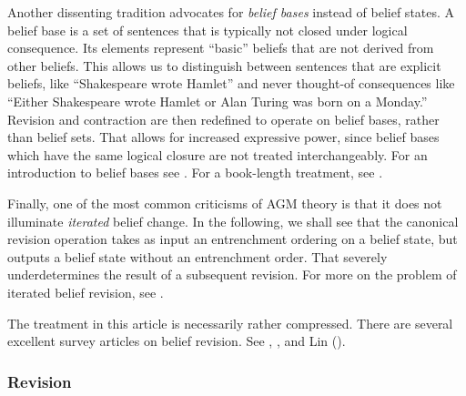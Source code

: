 Another dissenting tradition advocates for {\em belief bases} instead of belief
states. A belief base is a set of sentences that is typically not closed under
logical consequence. Its elements represent ``basic'' beliefs that are not
derived from other beliefs. This allows us to distinguish between sentences that
are explicit beliefs, like ``Shakespeare wrote Hamlet'' and never thought-of
consequences like ``Either Shakespeare wrote Hamlet or Alan Turing was born on a
Monday.''  Revision and contraction are then redefined to operate on belief
bases, rather than belief sets. That allows for increased expressive power,
since belief bases which have the same logical closure are not treated
interchangeably. For an introduction to belief bases see
\citet{sep-logic-belief-revision}. For a book-length treatment, see
\citet{hansson1999dynamics}.

Finally, one of the most common criticisms of AGM theory is that it does not
illuminate {\em iterated} belief change. In the following, we shall see that the
canonical revision operation takes as input an entrenchment ordering on a belief
state, but outputs a belief state without an entrenchment order. That severely
underdetermines the result of a subsequent revision. For more on the problem of
iterated belief revision, see \citet{huber2013belief}.

The treatment in this article is necessarily rather compressed. There are
several excellent survey articles on belief revision. See
\citet{sep-logic-belief-revision}, \citet{huber2013belief, huber2013ranking},
and Lin ().


\subsubsection{Revision}
\label{AGMrevision}

